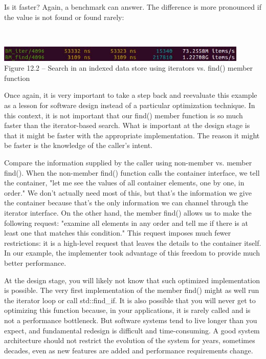 Is it faster? Again, a benchmark can answer. The difference is more pronounced if the value is not found or found rarely:

\hspace*{\fill} \\ %
\begin{center}
\includegraphics[width=0.9\textwidth]{content/3/chapter12/images/2.jpg}\\
Figure 12.2 – Search in an indexed data store using iterators vs. find() member function
\end{center}

Once again, it is very important to take a step back and reevaluate this example as a lesson for software design instead of a particular optimization technique. In this context, it is not important that our find() member function is so much faster than the iterator-based search. What is important at the design stage is that it might be faster with the appropriate implementation. The reason it might be faster is the knowledge of the caller's intent. 

Compare the information supplied by the caller using non-member vs. member find(). When the non-member find() function calls the container interface, we tell the container, "let me see the values of all container elements, one by one, in order." We don't actually need most of this, but that's the information we give the container because that's the only information we can channel through the iterator interface. On the other hand, the member find() allows us to make the following request: "examine all elements in any order and tell me if there is at least one that matches this condition." This request imposes much fewer restrictions: it is a high-level request that leaves the details to the container itself. In our example, the implementer took advantage of this freedom to provide much better performance.

At the design stage, you will likely not know that such optimized implementation is possible. The very first implementation of the member find() might as well run the iterator loop or call std::find\_if. It is also possible that you will never get to optimizing this function because, in your applications, it is rarely called and is not a performance bottleneck. But software systems tend to live longer than you expect, and fundamental redesign is difficult and time-consuming. A good system architecture should not restrict the evolution of the system for years, sometimes decades, even as new features are added and performance requirements change.

